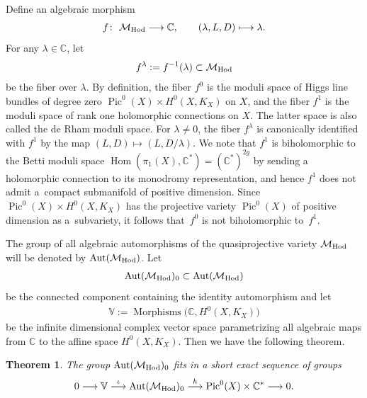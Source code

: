 \documentclass[pdftex]{sigma}
\numberwithin{equation}{section}
\newtheorem{Theorem}{Theorem}[section]
\begin{document}
Def\/ine an algebraic morphism
\begin{gather}\label{lf}
f \colon \ {\mathcal M}_{\rm Hod} \longrightarrow {\mathbb C} , \qquad (\lambda, L, D) \longmapsto \lambda .
\end{gather}
For any $\lambda \in \mathbb C$, let
\begin{gather*}%
f^\lambda := f^{-1}(\lambda) \subset {\mathcal M}_{\rm Hod}
\end{gather*}
be the f\/iber over $\lambda$. By def\/inition, the f\/iber $f^0$ is the moduli space of Higgs line bundles of degree zero $\operatorname{Pic}^0(X)\times H^0(X, K_X)$ on $X$, and the f\/iber $f^1$ is the moduli space of rank one holomorphic connections on $X$. The latter space is also called the de Rham moduli space. For $\lambda \not= 0$, the f\/iber $f^\lambda$ is canonically identif\/ied with $f^1$ by the map $(L, D) \longmapsto (L, D/\lambda)$. We note that $f^1$ is biholomorphic to the Betti moduli space $\operatorname{Hom}(\pi_1(X), {\mathbb C}^*) = ({\mathbb C}^*)^{2g}$ by sending a holomorphic connection to its monodromy representation, and hence $f^1$ does not admit a~compact submanifold of positive dimension. Since $\operatorname{Pic}^0(X)\times H^0(X, K_X)$ has the projective variety $\operatorname{Pic}^0(X)$ of positive dimension as a~subvariety, it follows that~$f^0$ is not biholomorphic to~$f^1$.

The group of all algebraic automorphisms of the quasiprojective variety
${\mathcal M}_{\rm Hod}$ will be denoted by $\operatorname{Aut}({\mathcal M}_{\rm Hod})$. Let
\begin{gather*}
\operatorname{Aut}({\mathcal M}_{\rm Hod})_0 \subset \operatorname{Aut}({\mathcal M}_{\rm Hod})
\end{gather*}
be the connected component containing the identity automorphism and
 let
\begin{gather*}
{\mathbb V} := \operatorname{Morphisms}\big({\mathbb C}, H^0(X, K_X)\big)
\end{gather*}
be the inf\/inite dimensional complex vector space parametrizing all algebraic maps from $\mathbb C$ to the af\/f\/ine space $H^0(X, K_X)$. Then we have the following theorem.
\begin{Theorem}\label{thm1}
The group $\operatorname{Aut}({\mathcal M}_{\rm Hod})_0$ fits in a short exact sequence of groups
\begin{gather*}
0 \longrightarrow {\mathbb V} \stackrel{\iota}{\longrightarrow} \operatorname{Aut}({\mathcal M}_{\rm Hod})_0 \stackrel{h}{\longrightarrow}
\operatorname{Pic}^0(X)\times {\mathbb C}^* \longrightarrow 0 .
\end{gather*}
\end{Theorem}
\end{document}
